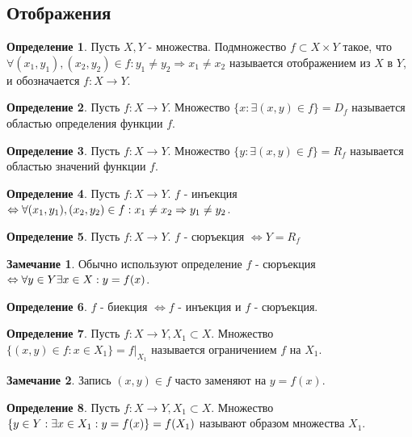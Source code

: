 \documentclass[a4paper, 12pt]{article}
\newcommand{\lra}{\Leftrightarrow}
\theoremstyle{definition}
\newtheorem*{definition}{Определение}
\newtheorem*{comm}{Замечание}
\begin{document}
    \subsection{Отображения}
        \begin{definition}
            Пусть $X, Y$ - множества. Подмножество $f\subset X\times Y$ такое, что $\forall (x_1,y_1), (x_2, y_2)\in f: y_1\ne y_2 \Rightarrow x_1\ne x_2$ называется отображением из $X$ в $Y$, и обозначается $f: X\to Y$.
        \end{definition}
        \begin{definition}
            Пусть $f:X\to Y$. Множество $\{x: \exists (x,y) \in f\} = D_f$ называется областью определения функции $f$.
        \end{definition}
        \begin{definition}
            Пусть $f:X\to Y$. Множество $\{y: \exists (x,y) \in f\} = R_f$ называется областью значений функции $f$.
        \end{definition}
        \begin{definition}
            Пусть $f:X\to Y$. $f$ - инъекция $\lra \forall (x_1,y_1), (x_2,y_2)\in f: \\ x_1\ne x_2 \Rightarrow y_1\ne y_2$.
        \end{definition}
        \begin{definition}
            Пусть $f:X\to Y$. $f$ - сюръекция $\lra Y=R_f$
        \end{definition}
        \begin{comm}
        Обычно используют определение $f$ - сюръекция $\lra \forall y\in Y \\ \exists x\in X: y=f(x)$.
        \end{comm}
        \begin{definition}
            $f$ - биекция $\lra f$ - инъекция и $f$ - сюръекция.
        \end{definition}
        \begin{definition}
            Пусть $f:X\to Y, X_1\subset X$. Множество $\{(x,y)\in f: x\in X_1\}=f|_{X_1}$ называется ограничением $f$ на $X_1$.
        \end{definition}
        \begin{comm}
        Запись $(x,y)\in f$ часто заменяют на $y=f(x)$.
        \end{comm}
        \begin{definition}
            Пусть $f:X\to Y, X_1\subset X$. Множество $\{y\in Y: \exists x\in X_1 : \\ y=f(x)\}=f(X_1)$ называют образом множества $X_1$.
        \end{definition}
\end{document}

